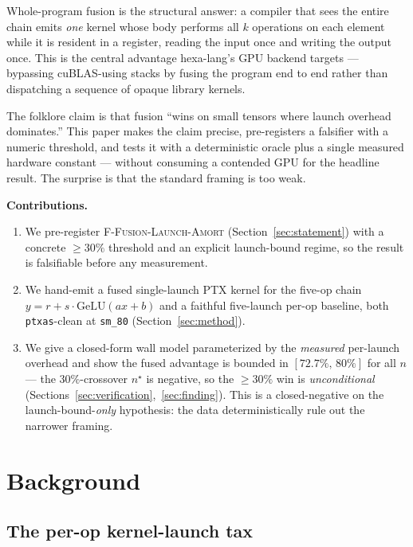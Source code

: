 \documentclass[11pt,a4paper]{article}
\newcommand{\falsifier}{\textsc{F-Fusion-Launch-Amort}}
\begin{document}
Whole-program fusion is the structural answer: a compiler that sees the entire
chain emits \emph{one} kernel whose body performs all $k$ operations on each
element while it is resident in a register, reading the input once and writing
the output once. This is the central advantage hexa-lang's GPU backend targets
--- bypassing cuBLAS-using stacks by fusing the program end to end rather than
dispatching a sequence of opaque library kernels.

The folklore claim is that fusion ``wins on small tensors where launch
overhead dominates.'' This paper makes the claim precise, pre-registers a
falsifier with a numeric threshold, and tests it with a deterministic oracle
plus a single measured hardware constant --- without consuming a contended GPU
for the headline result. The surprise is that the standard framing is too
weak.

\medskip
\noindent\textbf{Contributions.}
\begin{enumerate}\itemsep0.3em
\item We pre-register \falsifier{} (Section~\ref{sec:statement}) with a
  concrete $\ge 30\%$ threshold and an explicit launch-bound regime, so the
  result is falsifiable before any measurement.
\item We hand-emit a fused single-launch PTX kernel for the five-op chain
  $y = r + s\cdot\mathrm{GeLU}(a x + b)$ and a faithful five-launch per-op
  baseline, both \texttt{ptxas}-clean at \texttt{sm\_80}
  (Section~\ref{sec:method}).
\item We give a closed-form wall model parameterized by the
  \emph{measured} per-launch overhead and show the fused advantage is bounded
  in $[72.7\%,\,80\%]$ for all $n$ --- the $30\%$-crossover $n^\star$ is
  negative, so the $\ge 30\%$ win is \emph{unconditional}
  (Sections~\ref{sec:verification},~\ref{sec:finding}). This is a closed-negative
  on the launch-bound-\emph{only} hypothesis: the data deterministically rule
  out the narrower framing.
\end{enumerate}

\section{Background}
\label{sec:bg}

\subsection{The per-op kernel-launch tax}
\end{document}
